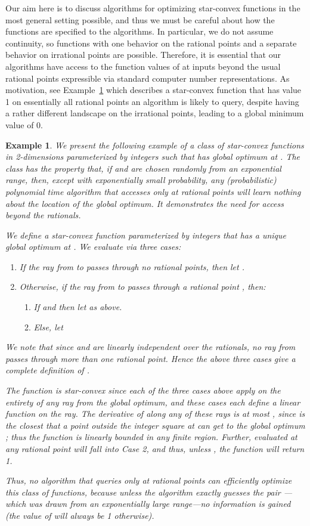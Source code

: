 \documentclass[11pt,letter]{article}
\newcounter{nTheorems}
\numberwithin{nTheorems}{section}
\newtheorem{example}[nTheorems]{Example}
\begin{document}
Our aim here is to discuss algorithms for optimizing star-convex functions in the most general setting possible, and thus we must be careful about how the functions are specified to the algorithms.
In particular, we do not assume continuity, so functions with one behavior on the rational points and a separate behavior on irrational points are possible. Therefore, it is essential that our algorithms have access to the function values of  at inputs beyond the usual rational points expressible via standard computer number representations.
As motivation, see Example~\ref{ex:rationals}
which describes a star-convex function that has value 1 on essentially all rational points an algorithm is likely to query, despite having a rather different landscape on the irrational points, leading to a global minimum value of 0.

\begin{example}\label{ex:rationals}
We present the following example of a class of star-convex functions  in 2-dimensions parameterized by integers  such that  has global optimum at .
The class has the property that, if  and  are chosen randomly from an exponential range, then, except with exponentially small probability, any (probabilistic) polynomial time algorithm that accesses  only at rational points will learn nothing about the location of the global optimum.
It demonstrates the need for access beyond the rationals.


We define a star-convex function  parameterized by integers  that has a unique global optimum at .
We evaluate  via three cases:
\begin{enumerate}
  \item If the ray from  to  passes through no rational points, then let .
  \item Otherwise, if the ray from  to  passes through a rational point , then:
    \begin{enumerate}
    \item If  and  then let  as above.
    \item Else, let 
  \end{enumerate}
\end{enumerate}
We note that since  and  are linearly independent over the rationals, no ray from  passes through more than one rational point.
Hence the above three cases give a complete definition of .

The function  is star-convex since each of the three cases above apply on the entirety of any ray from the global optimum, and these cases each define a linear function on the ray.
The derivative of  along any of these rays is at most , since  is the closest that a point outside the integer square at  can get to the global optimum ; thus the function is linearly bounded in any finite region.
Further,  evaluated at any \emph{rational} point  will fall into Case 2, and thus, unless , the function  will return 1.

Thus, no algorithm that queries  only at rational points can efficiently optimize this class of functions, because unless the algorithm \emph{exactly} guesses the pair ---which was drawn from an exponentially large range---no information is gained (the value of  will always be 1 otherwise).
\end{example}
\end{document}
